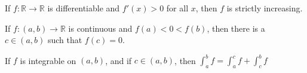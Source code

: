 \documentclass[crop=false,class=article,oneside]{standalone}
\begin{document}
    \begin{theorem*}
        If $f:\mathbb{R}\rightarrow \mathbb{R}$
        is differentiable
        and $f'(x)>0$ for all $x$,
        then $f$ is strictly increasing.
    \end{theorem*}
    \begin{theorem*}
        If $f:(a,b)\rightarrow\mathbb{R}$ is continuous and
        $f(a)<0<f(b)$, then there is a $c\in (a,b)$ such that
        $f(c)=0$.
    \end{theorem*}
    \begin{theorem*}
        If $f$ is integrable on $(a,b)$, and if $c\in(a,b)$, then
        $\int_{a}^{b}f=\int_{a}^{c}f+\int_{c}^{b}f$
    \end{theorem*}
\end{document}
